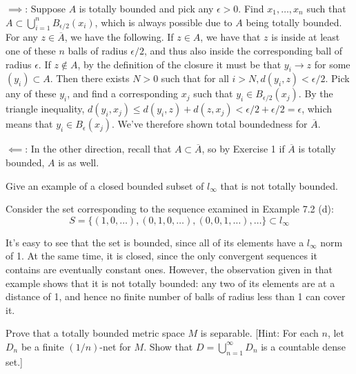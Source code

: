 \begin{solution}
    
   $\implies$: Suppose $A$ is totally bounded and pick any $\epsilon > 0$.
   Find $x_1, \ldots, x_n$ such that $A \subset \bigcup_{i=1}^{n} B_{\epsilon/2} (x_i)$, which is always possible due to $A$ being totally bounded.
   For any $z \in \overline{A}$, we have the following.
   If $z \in A$, we have that $z$ is inside at least one of these $n$ balls of radius $\epsilon/2$, and thus also inside the corresponding ball of radius $\epsilon$.
   If $z \notin A$, by the definition of the closure it must be that $y_i \rightarrow z$ for some $(y_i) \subset A$.
   Then there exists $N > 0$ such that for all $i > N, d(y_i, z) < \epsilon/2$.
   Pick any of these $y_i$, and find a corresponding $x_j$ such that $y_i \in B_{\epsilon/2}(x_j)$.
   By the triangle inequality, $d(y_i, x_j) \leq d(y_i, z) + d(z, x_j) < \epsilon/2 + \epsilon/2 = \epsilon$, which means that $y_i \in B_{\epsilon}(x_j)$.
   We've therefore shown total boundedness for $\overline{A}$.

   $\impliedby$: In the other direction, recall that $A \subset \overline{A}$, so by Exercise 1 if $\overline{A}$ is totally bounded, $A$ is as well.
\end{solution}

\begin{exercise}{9}
    Give an example of a closed bounded subset of $l_{\infty}$ that is not totally bounded.
\end{exercise}

\begin{solution}
    
    Consider the set corresponding to the sequence examined in Example 7.2 (d):
    \[S = \{(1, 0, \ldots), (0, 1, 0, \ldots), (0, 0, 1, \ldots), \ldots\} \subset l_{\infty}\]

    It's easy to see that the set is bounded, since all of its elements have a $l_\infty$ norm of 1.
    At the same time, it is closed, since the only convergent sequences it contains are eventually constant ones.
    However, the observation given in that example shows that it is not totally bounded: any two of its elements are at a distance of 1, and hence no finite number of balls of radius less than 1 can cover it.

\end{solution}

\begin{exercise}{10}
    Prove that a totally bounded metric space $M$ is separable. [Hint: For each $n$, let $D_n$ be a finite $(1/n)$-net for $M$.
    Show that $D = \bigcup_{n=1}^{\infty} D_n$ is a countable dense set.]
\end{exercise}

